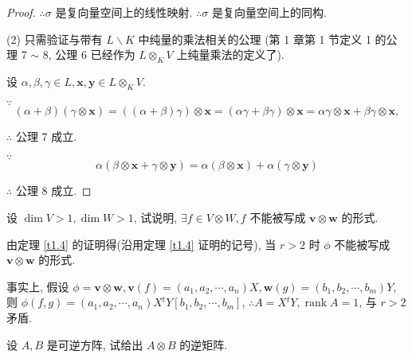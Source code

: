 \documentclass{ctexart}
\begin{document}
\begin{proof}
    $\therefore\sigma$ 是复向量空间上的线性映射. $\therefore\sigma$ 是复向量空间上的同构.

    (2) 只需验证与带有 $L\backslash K$ 中纯量的乘法相关的公理 (第 1 章第 1 节定义 1 的公理 7 $\sim$ 8, 公理 6 已经作为 $L\otimes_KV$ 上纯量乘法的定义了).

    设 $\alpha,\beta,\gamma\in L,\boldsymbol{x},\boldsymbol{y}\in L\otimes_KV$.

    $\because$
    \[(\alpha+\beta)(\gamma\otimes\boldsymbol{x})=((\alpha+\beta)\gamma)\otimes\boldsymbol{x}=(\alpha\gamma+\beta\gamma)\otimes\boldsymbol{x}=\alpha\gamma\otimes\boldsymbol{x}+\beta\gamma\otimes\boldsymbol{x},\]

    $\therefore$ 公理 7 成立.

    $\because$
    \[\alpha(\beta\otimes\boldsymbol{x}+\gamma\otimes\boldsymbol{y})=\alpha(\beta\otimes\boldsymbol{x})+\alpha(\gamma\otimes\boldsymbol{y})\]

    $\therefore$ 公理 8 成立.
\end{proof}
\begin{exercise}%
    设 $\dim V>1,\dim W>1$, 试说明, $\exists f\in V\otimes W,f$ 不能被写成 $\boldsymbol{v}\otimes\boldsymbol{w}$ 的形式.
\end{exercise}
\begin{solution}
    由定理 \ref{t1.4} 的证明得(沿用定理 \ref{t1.4} 证明的记号), 当 $r>2$ 时 $\phi$ 不能被写成 $\boldsymbol{v}\otimes\boldsymbol{w}$ 的形式.
    
    事实上, 假设 $\phi=\boldsymbol{v}\otimes\boldsymbol{w},\boldsymbol{v}(f)=(a_1,a_2,\cdots,a_n)X,\boldsymbol{w}(g)=(b_1,b_2,\cdots,b_m)Y$, 则 $\phi(f,g)=(a_1,a_2,\cdots,a_n)X{}^tY[b_1,b_2,\cdots,b_m]$, $\therefore A=X{}^tY,\operatorname{rank}A=1$, 与 $r>2$ 矛盾.
\end{solution}
\begin{exercise}%
    设 $A,B$ 是可逆方阵, 试给出 $A\otimes B$ 的逆矩阵.
\end{exercise}
\end{document}
